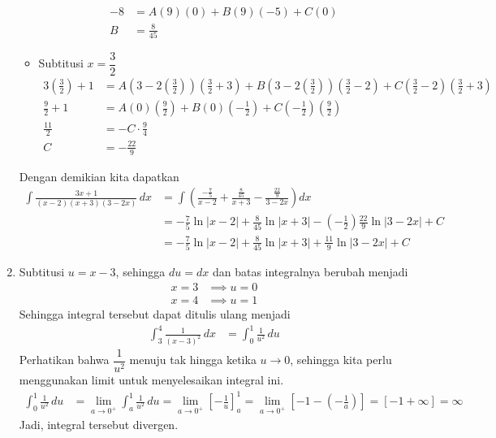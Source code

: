\documentclass[11pt,openany,a4paper]{article}
\begin{document}
\begin{enumerate}
\begin{itemize}
\begin{align*}
            -8 &= A(9)(0) + B(9)(-5) + C(0) \\
            B &= \frac{8}{45}
          \end{align*}
          \item Subtitusi $x=\dfrac{3}{2}$
          \begin{align*}
            3\left(\frac{3}{2}\right) + 1 &= A\left(3 - 2\left(\frac{3}{2}\right)\right)\left(\frac{3}{2} + 3\right) + B\left(3 - 2\left(\frac{3}{2}\right)\right)\left(\frac{3}{2} - 2\right) + C\left(\frac{3}{2} - 2\right)\left(\frac{3}{2} + 3\right) \\
            \frac{9}{2} + 1 &= A(0)\left(\frac{9}{2}\right) + B(0)\left(-\frac{1}{2}\right) + C\left(-\frac{1}{2}\right)\left(\frac{9}{2}\right) \\
            \frac{11}{2} &= -C \cdot \frac{9}{4} \\
            C &= -\frac{22}{9}
          \end{align*}
        \end{itemize}
        Dengan demikian kita dapatkan
        \begin{align*}
          \int \frac{3x + 1}{(x - 2)(x + 3)(3 - 2x)} \, dx &= \int \left(\frac{-\frac{7}{5}}{x - 2} + \frac{\frac{8}{45}}{x + 3} - \frac{\frac{22}{9}}{3 - 2x}\right)dx \\
          &= -\frac{7}{5}\ln|x - 2| + \frac{8}{45}\ln|x + 3| - \left(-\frac{1}{2}\right) \frac{22}{9}\ln|3 - 2x| + C \\
          &= \boxed{-\frac{7}{5}\ln|x - 2| + \frac{8}{45}\ln|x + 3| + \frac{11}{9}\ln|3 - 2x| + C}
        \end{align*}
        \item Subtitusi $u = x - 3$, sehingga $du = dx$ dan batas integralnya berubah menjadi
        \begin{align*}
          x = 3 &\implies u = 0 \\
          x = 4 &\implies u = 1
        \end{align*}
        Sehingga integral tersebut dapat ditulis ulang menjadi
        \begin{align*}
          \int_3^4 \frac{1}{(x - 3)^2} \, dx &= \int_0^1 \frac{1}{u^2} \, du
        \end{align*}
        Perhatikan bahwa $\dfrac{1}{u^2}$ menuju tak hingga ketika $u \to 0$, sehingga kita perlu menggunakan limit untuk menyelesaikan integral ini.
        \begin{align*}
          \int_0^1 \frac{1}{u^2} \, du &= \lim_{a\to 0^+}\int_a^1 \frac{1}{u^2} \, du 
          = \lim_{a\to 0^+}\left[-\frac{1}{u}\right]_a^1 
          = \lim_{a\to 0^+}\left[-1 - \left(-\frac{1}{a}\right)\right] 
          = \left[-1 + \infty\right] 
          = \boxed{\infty}
        \end{align*} 
        Jadi, integral tersebut divergen.
    \end{enumerate}
\end{document}
